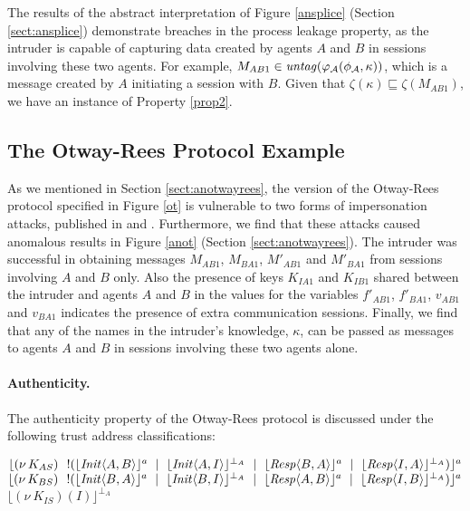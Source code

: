 \documentclass[10pt,a4paper,final,oneside,fleqn]{book}
\begin{document}
\noindent
The results of the abstract interpretation of Figure \ref{ansplice} (Section \ref{sect:ansplice}) demonstrate breaches in the process leakage property, as the intruder is capable of capturing data created by agents $A$ and $B$ in sessions involving these two agents. For example, $M_{AB1}\in\mbox{{\itshape untag\/}}(\varphi_\mathcal{A}(\phi_\mathcal{A},\kappa))$, which is a message created by $A$ initiating a session with $B$. Given that $\zeta(\kappa)\sqsubseteq\zeta(M_{AB1})$, we have an instance of Property \ref{prop2}.
\subsection{The Otway-Rees Protocol Example}
As we mentioned in Section \ref{sect:anotwayrees}, the version of the Otway-Rees protocol specified in Figure \ref{ot} is vulnerable to two forms of impersonation attacks, published in \cite{paulson1} and \cite{boyd1}. Furthermore, we find that these attacks caused anomalous results in Figure \ref{anot} (Section \ref{sect:anotwayrees}).  The intruder was successful in obtaining messages $M_{AB1}$, $M_{BA1}$, $M'_{AB1}$ and $M'_{BA1}$ from sessions involving $A$ and $B$ only.  Also the presence of keys $K_{IA1}$ and $K_{IB1}$ shared between the intruder and agents $A$ and $B$ in the values for the variables $f'_{AB1}$, $f'_{BA1}$, $v_{AB1}$ and $v_{BA1}$ indicates the presence of extra communication sessions.  Finally, we find that any of the names in the intruder's knowledge, $\kappa$, can be passed as messages to agents $A$ and $B$ in sessions involving these two agents alone.

\paragraph{Authenticity.} The authenticity property of the Otway-Rees protocol is discussed under the following trust address classifications:\vspace{6mm}

\noindent
$\lfloor (\nu~\!K_{AS})~~!(\lfloor \mbox{{\itshape Init\/}}\langle A,B\rangle\rfloor^a~\mid~\lfloor \mbox{{\itshape Init\/}}\langle A,I\rangle\rfloor^{\bot_A}~\mid~\lfloor \mbox{{\itshape Resp\/}}\langle B,A\rangle\rfloor^{a}~\mid~\lfloor \mbox{{\itshape Resp\/}}\langle I,A\rangle\rfloor^{\bot_A})\rfloor^a$\\
$\lfloor (\nu~\!K_{BS})~~!(\lfloor \mbox{{\itshape Init\/}}\langle B,A\rangle\rfloor^a~\mid~\lfloor \mbox{{\itshape Init\/}}\langle B,I\rangle\rfloor^{\bot_A}~\mid~\lfloor \mbox{{\itshape Resp\/}}\langle A,B\rangle\rfloor^a~\mid~\lfloor \mbox{{\itshape Resp\/}}\langle I,B\rangle\rfloor^{\bot_A})\rfloor^a$\\
$\lfloor (\nu~\!K_{IS})(I)\rfloor^{\bot_A}$\vspace{6mm}
\end{document}
